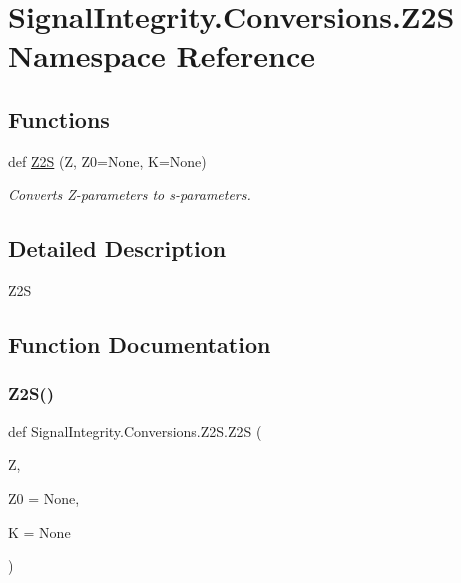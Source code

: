 \hypertarget{namespaceSignalIntegrity_1_1Conversions_1_1Z2S}{}\section{Signal\+Integrity.\+Conversions.\+Z2S Namespace Reference}
\label{namespaceSignalIntegrity_1_1Conversions_1_1Z2S}
\subsection*{Functions}
\begin{DoxyCompactItemize}
\item 
def \hyperlink{namespaceSignalIntegrity_1_1Conversions_1_1Z2S_a80c95ba77ea32ef71f24be0303687194}{Z2S} (Z, Z0=None, K=None)
\begin{DoxyCompactList}\small\item\em Converts Z-\/parameters to s-\/parameters. \end{DoxyCompactList}\end{DoxyCompactItemize}


\subsection{Detailed Description}
\begin{DoxyVerb}Z2S\end{DoxyVerb}
 

\subsection{Function Documentation}
\mbox{\label{namespaceSignalIntegrity_1_1Conversions_1_1Z2S_a80c95ba77ea32ef71f24be0303687194}} 
\subsubsection{\texorpdfstring{Z2\+S()}{Z2S()}}
{\footnotesize\ttfamily def Signal\+Integrity.\+Conversions.\+Z2\+S.\+Z2S (\begin{DoxyParamCaption}\item[{}]{Z,  }\item[{}]{Z0 = {\ttfamily None},  }\item[{}]{K = {\ttfamily None} }\end{DoxyParamCaption})}



